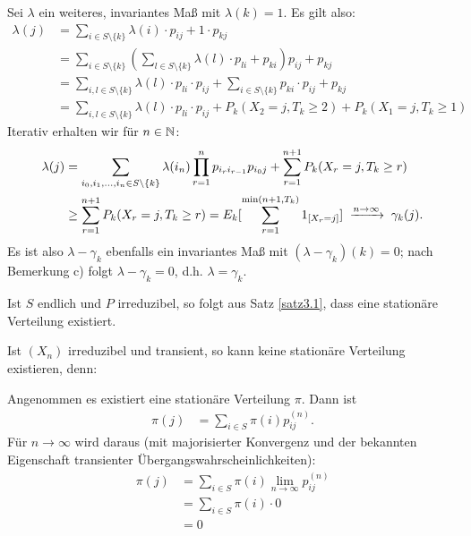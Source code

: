 \documentclass[a4paper,twoside,DIV15,BCOR12mm]{scrbook}
\begin{document}
\begin{beweis}
\begin{enuma}
\item 
  Sei $\lambda$ ein weiteres, invariantes Maß mit $\lambda(k)=1$. Es gilt also:
  \begin{align*}
    \lambda(j) &= \sum_{i \in S\setminus\{k\}} \lambda(i) \cdot p_{ij} + 1 \cdot p_{kj}\\
               &= \sum_{i \in S\setminus\{k\}} \left( \sum_{l \in S\setminus\{k\}} \lambda(l) \cdot p_{li} + p_{ki} \right) p_{ij} + p_{kj}\\
               &= \sum_{i,l \in S\setminus\{k\}} \lambda(l) \cdot p_{li} \cdot p_{ij} + \sum_{i \in S\setminus\{k\}} p_{ki} \cdot p_{ij} + p_{kj}\\
               &= \sum_{i,l \in S\setminus\{k\}} \lambda(l) \cdot p_{li} \cdot p_{ij} + P_k(X_2 = j, T_k \geq 2) + P_k(X_1 = j, T_k \geq 1)
  \end{align*}
  Iterativ erhalten wir für $n \in \mathbb{N}$:
  \begin{align*}
    \lambda(j) &= \sum_{i_0, i_1, \ldots, i_n \in S\setminus\{k\}} \lambda (i_n) \prod_{r=1}^n p_{i_ri_{r-1}} p_{i_0j} + \sum_{r=1}^{n+1} P_k(X_r = j, T_k \geq r)\\
               &\geq \sum_{r=1}^{n+1} P_k(X_r = j, T_k \geq r) = E_k[\sum_{r=1}^{\min(n+1,T_k)} 1_{[X_r = j]}] \tomit{n\to\infty} \gamma_k(j).
  \end{align*}
  Es ist also $\lambda - \gamma_k$ ebenfalls ein invariantes Maß mit $(\lambda - \gamma_k)(k) = 0$; nach Bemerkung c) folgt
  $\lambda - \gamma_k = 0$, d.h. $\lambda = \gamma_k$.
\end{enuma}

\end{beweis}

\begin{bemerkung}
\begin{enuma}
\item Ist $S$ endlich und $P$ irreduzibel, so folgt aus Satz \ref{satz3.1}, dass eine stationäre Verteilung existiert.
\item Ist $(X_n)$ irreduzibel und transient, so kann  keine stationäre Verteilung existieren, denn:

Angenommen es existiert eine stationäre Verteilung $\pi$. Dann ist
\begin{align*}
\pi(j) &= \sum_{i\in S} \pi(i) p_{ij}^{(n)}.
\end{align*}
Für $n\to\infty$ wird daraus (mit majorisierter Konvergenz und der bekannten Eigenschaft transienter Übergangswahrscheinlichkeiten):
\begin{align*}
\pi(j) &= \sum_{i\in S} \pi(i) \lim_{n\to\infty} p_{ij}^{(n)} \\
&= \sum_{i\in S} \pi(i) \cdot 0 \\
&= 0
\end{align*}
\end{enuma}

\end{bemerkung}
\end{document}
